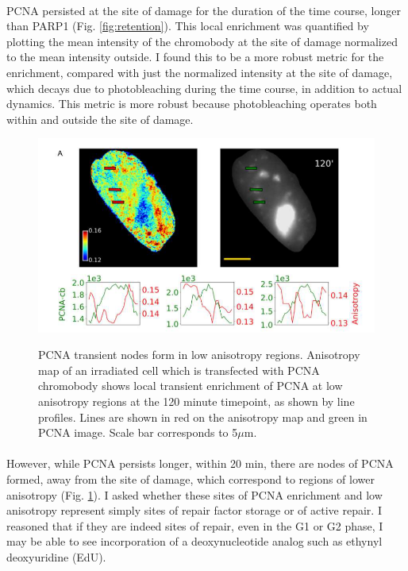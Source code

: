 \paragraph*{} PCNA persisted at the site of damage for the duration of the time course, longer than PARP1 (Fig. \ref{fig:retention}). This local enrichment was quantified by plotting the mean intensity of the chromobody at the site of damage normalized to the mean intensity outside. I found this to be a more robust metric for the enrichment, compared with just the normalized intensity at the site of damage, which decays due to photobleaching during the time course, in addition to actual dynamics. This metric is more robust because photobleaching operates both within and outside the site of damage. 

\begin{figure}[H]
    {\hfill\includegraphics[clip, width=1\linewidth]{figures/node.png}\hspace*{\fill}}
    \caption{PCNA transient nodes form in low anisotropy regions. Anisotropy map of an irradiated cell which is transfected with PCNA chromobody shows local transient enrichment of PCNA at low anisotropy regions at the 120 minute timepoint, as shown by line profiles. Lines are shown in red on the anisotropy map and green in PCNA image. Scale bar corresponds to 5$\mu$m.}
    {\label{fig:node}}
\end{figure}

\paragraph*{} However, while PCNA persists longer, within 20 min, there are nodes of PCNA formed, away from the site of damage, which correspond to regions of lower anisotropy (Fig. \ref{fig:node}). I asked whether these sites of PCNA enrichment and low anisotropy represent simply sites of repair factor storage or of active repair. I reasoned that if they are indeed sites of repair, even in the G1 or G2 phase, I may be able to see incorporation of a deoxynucleotide analog such as ethynyl deoxyuridine (EdU). 



